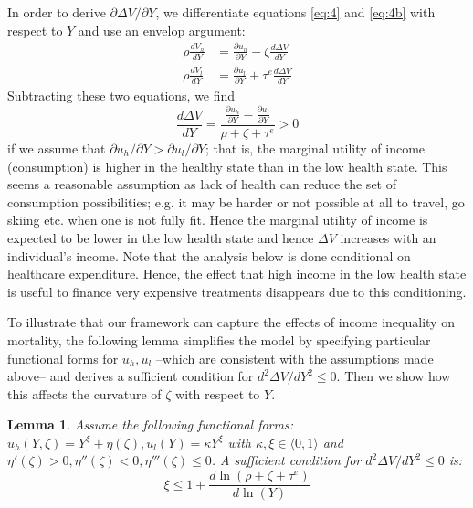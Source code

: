 \documentclass[12pt,english,a4paper]{article}
\newtheorem{lemma}{Lemma}
\begin{document}
In order to derive \(\partial \Delta V/ \partial Y\), we differentiate equations \eqref{eq:4} and \eqref{eq:4b} with respect to \(Y\) and use an envelop argument:
\begin{align}
\label{eq:25}
\rho \frac{dV_h}{dY} &= \frac{\partial u_h}{\partial Y} - \zeta \frac{d \Delta V}{d Y} \\
\label{eq:25b}
\rho \frac{dV_l}{dY} &= \frac{\partial u_l}{\partial Y} + \tau^e \frac{d \Delta V}{d Y}
\end{align}
Subtracting these two equations, we find
\begin{equation}
\label{eq:26}
\frac{d \Delta V}{dY} = \frac{\frac{\partial u_h}{\partial Y} - \frac{\partial u_l}{\partial Y}}{\rho + \zeta + \tau^e} > 0
\end{equation}
if we assume that \(\partial u_h/\partial Y > \partial u_l /\partial Y\); that is, the marginal utility of income (consumption) is higher in the healthy state than in the low health state. This seems a reasonable assumption as lack of health can reduce the set of consumption possibilities; e.g. it may be harder or not possible at all to travel, go skiing etc. when one is not fully fit. Hence the marginal utility of income is expected to be lower in the low health state and hence \(\Delta V\) increases with an individual's income. Note that the analysis below is done conditional on healthcare expenditure. Hence, the effect that high income in the low health state is useful to finance very expensive treatments disappears due to this conditioning.

To illustrate that our framework can capture the effects of income inequality on mortality, the following lemma simplifies the model by specifying particular functional forms for \(u_h, u_l\) --which are consistent with the assumptions made above-- and derives a sufficient condition for \(d^2 \Delta V/dY^2 \leq 0\). Then we show how this affects the curvature of \(\zeta\) with respect to \(Y\).

\begin{lemma}
\label{lem:VY}
Assume the following functional forms: \(u_h(Y,\zeta)=Y^{\xi} + \eta(\zeta), u_l(Y)=\kappa Y^{\xi}\) with \(\kappa, \xi \in \langle 0,1 \rangle\) and \(\eta'(\zeta) > 0, \eta''(\zeta) < 0, \eta'''(\zeta) \leq 0\). A sufficient condition for \(d^2 \Delta V/dY^2 \leq 0\) is:
\begin{equation}
\label{eq:24}
\xi \leq 1 + \frac{d \ln(\rho+\zeta+\tau^e)}{d \ln(Y)}
\end{equation}
\end{lemma}
\end{document}
